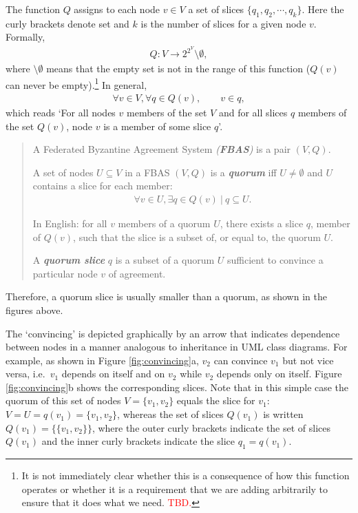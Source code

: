 The function $Q$ assigns to each node $v \in V$ a set of slices $\{ q_1, q_2, \cdots, q_k \}$. Here the curly brackets denote set and $k$ is the number of slices for a given node $v$. Formally,
\begin{align}
Q\colon V \rightarrow 2^{2^V} \setminus \emptyset,
\end{align}
where $\setminus \emptyset$ means that the empty set is not in the range of this function ($Q(v)$ can never be empty).\footnote{It is not immediately clear whether this is a consequence of how this function operates or whether it is a requirement that we are adding arbitrarily to ensure that it does what we need. \textcolor{red}{TBD.}} In general,
\begin{align}
\forall v \in V, \forall q \in Q(v), \qquad v \in q,
\end{align}
which reads `For all nodes $v$ members of the set $V$ and for all slices $q$ members of the set $Q(v)$, node $v$ is a member of some slice $q$'.
\begin{quote}
\vspace{-0.6cm}
\small
\begin{defin}
A Federated Byzantine Agreement System \emph{(\textbf{FBAS})} is a pair $(V, Q)$.
\end{defin}
\begin{defin}
\label{quorum}
A set of nodes $U \subseteq V$ in a FBAS $(V, Q)$ is a \emph{\textbf{quorum}} iff $U \ne \emptyset$ and $U$ contains a slice for each member:
\begin{align}
\forall v \in U, \exists q \in Q(v) \ | \  q \subseteq U.
\end{align}
\end{defin}
In English: for all $v$ members of a quorum $U$, there exists a slice $q$, member of $Q(v)$, such that the slice is a subset of, or equal to, the quorum $U$.
\begin{defin}
\label{quorumslice}
A \emph{\textbf{quorum slice}} $q$ is a subset of a quorum $U$ sufficient to convince a particular node $v$ of agreement.
\end{defin}
\end{quote}
Therefore, a quorum slice is usually smaller than a quorum, as shown in the figures above.

The `convincing' is depicted graphically by an arrow that indicates dependence between nodes in a manner analogous to inheritance in UML class diagrams. For example, as shown in Figure \ref{fig:convincing}a, $v_2$ can convince $v_1$ but not vice versa, i.e.\ $v_1$ depends on itself and on $v_2$ while $v_2$ depends only on itself. Figure \ref{fig:convincing}b shows the corresponding slices. Note that in this simple case the quorum of this set of nodes $V = \{ v_1, v_2 \}$ equals the slice for $v_1$: $V = U = q(v_1) = \{ v_1, v_2 \}$, whereas the set of slices $Q(v_1)$ is written $Q(v_1) = \{ \{ v_1, v_2 \} \}$, where the outer curly brackets indicate the set of slices $Q(v_1)$ and the inner curly brackets indicate the slice $q_1 = q(v_1)$.

